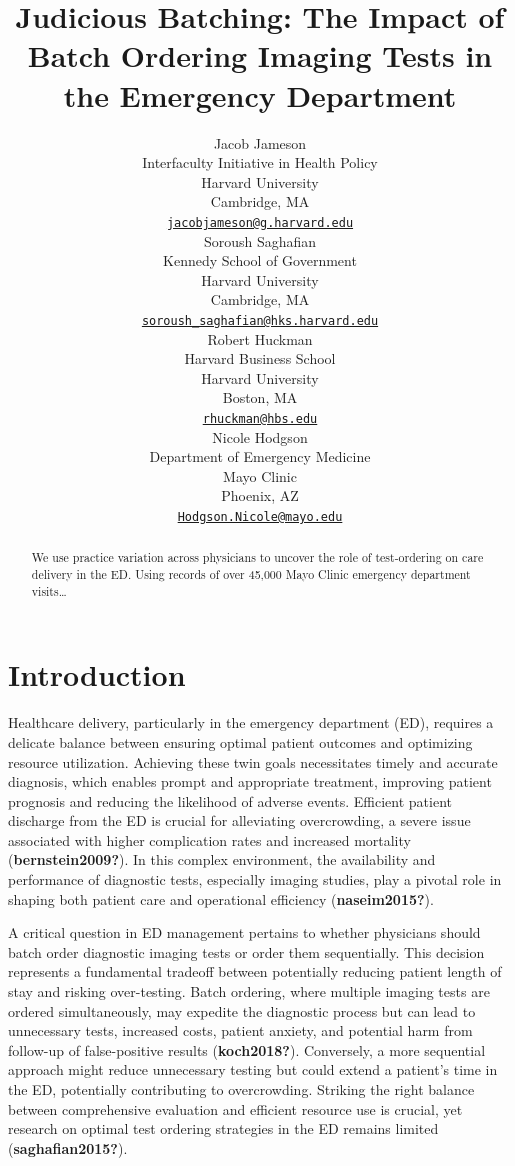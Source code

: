 \documentclass{article}
\title{Judicious Batching: The Impact of Batch Ordering Imaging Tests in
the Emergency Department}
\author{
    Jacob Jameson
   \\
    Interfaculty Initiative in Health Policy \\
    Harvard University \\
  Cambridge, MA \\
  \texttt{\href{mailto:jacobjameson@g.harvard.edu}{\nolinkurl{jacobjameson@g.harvard.edu}}} \\
   \And
    Soroush Saghafian
   \\
    Kennedy School of Government \\
    Harvard University \\
  Cambridge, MA \\
  \texttt{\href{mailto:soroush_saghafian@hks.harvard.edu}{\nolinkurl{soroush\_saghafian@hks.harvard.edu}}} \\
   \And
    Robert Huckman
   \\
    Harvard Business School \\
    Harvard University \\
  Boston, MA \\
  \texttt{\href{mailto:rhuckman@hbs.edu}{\nolinkurl{rhuckman@hbs.edu}}} \\
   \And
    Nicole Hodgson
   \\
    Department of Emergency Medicine \\
    Mayo Clinic \\
  Phoenix, AZ \\
  \texttt{\href{mailto:Hodgson.Nicole@mayo.edu}{\nolinkurl{Hodgson.Nicole@mayo.edu}}} \\
  }
\begin{document}
\maketitle


\begin{abstract}
We use practice variation across physicians to uncover the role of
test-ordering on care delivery in the ED. Using records of over 45,000
Mayo Clinic emergency department visits\ldots{}
\end{abstract}


\hypertarget{sec:I}{%
\section{Introduction}\label{sec:I}}

Healthcare delivery, particularly in the emergency department (ED),
requires a delicate balance between ensuring optimal patient outcomes
and optimizing resource utilization. Achieving these twin goals
necessitates timely and accurate diagnosis, which enables prompt and
appropriate treatment, improving patient prognosis and reducing the
likelihood of adverse events. Efficient patient discharge from the ED is
crucial for alleviating overcrowding, a severe issue associated with
higher complication rates and increased mortality
(\textbf{bernstein2009?}). In this complex environment, the availability
and performance of diagnostic tests, especially imaging studies, play a
pivotal role in shaping both patient care and operational efficiency
(\textbf{naseim2015?}).

A critical question in ED management pertains to whether physicians
should batch order diagnostic imaging tests or order them sequentially.
This decision represents a fundamental tradeoff between potentially
reducing patient length of stay and risking over-testing. Batch
ordering, where multiple imaging tests are ordered simultaneously, may
expedite the diagnostic process but can lead to unnecessary tests,
increased costs, patient anxiety, and potential harm from follow-up of
false-positive results (\textbf{koch2018?}). Conversely, a more
sequential approach might reduce unnecessary testing but could extend a
patient's time in the ED, potentially contributing to overcrowding.
Striking the right balance between comprehensive evaluation and
efficient resource use is crucial, yet research on optimal test ordering
strategies in the ED remains limited (\textbf{saghafian2015?}).
\end{document}
